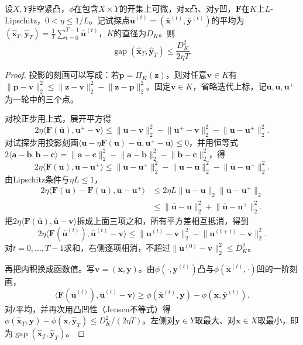 \begin{theorem}[外梯度法的平均间隙]
\label{thm:opt-mmb-extragradient}
设$X,Y$非空紧凸，$\phi$在包含$X\times Y$的开集上可微，对$\bm x$凸、对$\bm y$凹，$\bm F$在$K$上$L$-Lipschitz，$0<\eta\leq1/L$。记试探点$\bar{\bm u}^{(t)}=(\bar{\bm x}^{(t)},\bar{\bm y}^{(t)})$的平均为$(\hat{\bm x}_T,\hat{\bm y}_T)=\frac1T\sum_{t=0}^{T-1}\bar{\bm u}^{(t)}$，$K$的直径为$D_K$。则
\[
\operatorname{gap}(\hat{\bm x}_T,\hat{\bm y}_T)\leq\frac{D_K^2}{2\eta T}.
\]
\end{theorem}

\begin{proof}
投影的刻画可以写成：若$\bm p=\Pi_K(\bm z)$，则对任意$\bm v\in K$有$\lVert\bm p-\bm v\rVert_2^2\leq\lVert\bm z-\bm v\rVert_2^2-\lVert\bm z-\bm p\rVert_2^2$。固定$\bm v\in K$，省略迭代上标，记$\bm u,\bar{\bm u},\bm u^+$为一轮中的三个点。

对校正步用上式，展开平方得
\[
2\eta\langle\bm F(\bar{\bm u}),\bm u^+-\bm v\rangle\leq\lVert\bm u-\bm v\rVert_2^2-\lVert\bm u^+-\bm v\rVert_2^2-\lVert\bm u-\bm u^+\rVert_2^2.
\]
对试探步用投影刻画$\langle\bm u-\eta\bm F(\bm u)-\bar{\bm u},\bm u^+-\bar{\bm u}\rangle\leq0$，并用恒等式$2\langle\bm a-\bm b,\bm b-\bm c\rangle=\lVert\bm a-\bm c\rVert_2^2-\lVert\bm a-\bm b\rVert_2^2-\lVert\bm b-\bm c\rVert_2^2$，得
\[
2\eta\langle\bm F(\bm u),\bar{\bm u}-\bm u^+\rangle\leq\lVert\bm u-\bm u^+\rVert_2^2-\lVert\bm u-\bar{\bm u}\rVert_2^2-\lVert\bar{\bm u}-\bm u^+\rVert_2^2.
\]
由Lipschitz条件与$\eta L\leq1$，
\[
\begin{aligned}
2\eta\langle\bm F(\bar{\bm u})-\bm F(\bm u),\bar{\bm u}-\bm u^+\rangle&\leq2\eta L\lVert\bar{\bm u}-\bm u\rVert_2\lVert\bar{\bm u}-\bm u^+\rVert_2\\
&\leq\lVert\bar{\bm u}-\bm u\rVert_2^2+\lVert\bar{\bm u}-\bm u^+\rVert_2^2.
\end{aligned}
\]
把$2\eta\langle\bm F(\bar{\bm u}),\bar{\bm u}-\bm v\rangle$拆成上面三项之和，所有平方差相互抵消，得到
\[
2\eta\langle\bm F(\bar{\bm u}^{(t)}),\bar{\bm u}^{(t)}-\bm v\rangle\leq\lVert\bm u^{(t)}-\bm v\rVert_2^2-\lVert\bm u^{(t+1)}-\bm v\rVert_2^2.
\]
对$t=0,\dots,T-1$求和，右侧逐项相消，不超过$\lVert\bm u^{(0)}-\bm v\rVert_2^2\leq D_K^2$。

再把内积换成函数值。写$\bm v=(\bm x,\bm y)$。由$\phi(\cdot,\bar{\bm y}^{(t)})$凸与$\phi(\bar{\bm x}^{(t)},\cdot)$凹的一阶刻画，
\[
\langle\bm F(\bar{\bm u}^{(t)}),\bar{\bm u}^{(t)}-\bm v\rangle\geq\phi(\bar{\bm x}^{(t)},\bm y)-\phi(\bm x,\bar{\bm y}^{(t)}).
\]
对$t$平均，并再次用凸凹性（Jensen不等式）得$\phi(\hat{\bm x}_T,\bm y)-\phi(\bm x,\hat{\bm y}_T)\leq D_K^2/(2\eta T)$。左侧对$\bm y\in Y$取最大、对$\bm x\in X$取最小，即为$\operatorname{gap}(\hat{\bm x}_T,\hat{\bm y}_T)$。
\end{proof}

